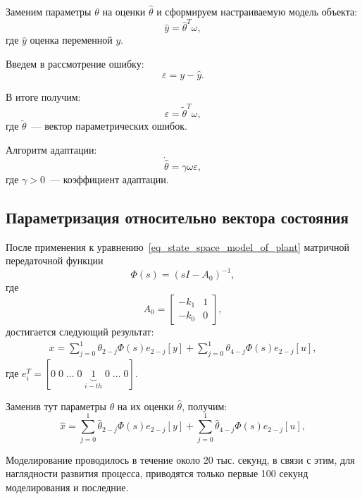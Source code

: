 Заменим	параметры $\theta$ на оценки $\hat{\theta}$ и сформируем настраиваемую модель объекта:
\begin{equation}
\hat{y} = \hat\theta^T \omega,
\end{equation}
где $\hat{y}$ оценка переменной  $y$. 

Введем в рассмотрение ошибку:
\begin{equation}
	\varepsilon = y - \hat{y}.
\end{equation}

В итоге получим:
\begin{equation}
	\varepsilon = \tilde{\theta}^T \omega,
\end{equation}
где $\tilde{\theta}$~--- вектор параметрических ошибок.

Алгоритм адаптации:
\begin{equation}\label{aa}
	\dot{\hat{\theta}} = \gamma \omega \varepsilon,
\end{equation}
где $\gamma > 0$~--- коэффициент адаптации.

\subsection{Параметризация относительно вектора состояния}
После применения к уравнению~\eqref{eq_state_space_model_of_plant} матричной передаточной функции
\begin{equation}
\Phi(s) = (sI - A_0)^{-1},
\end{equation}
где
\begin{equation}
A_0 =
\begin{bmatrix}
-k_1 & 1 \\
-k_0 & 0
\end{bmatrix} \!\!,
\end{equation}
достигается следующий результат:
\begin{gather}
x = \sum_{j=0}^{1} \theta_{2-j} \Phi(s) e_{2-j} [y] + \sum_{j=0}^{1} \theta_{4-j} \Phi(s) e_{2-j} [u],
\end{gather}
где $e_i^T = [0\;0\;\ldots\;0\;\underbrace{1}_{i-th}\;0\;\ldots\;0]$.

Заменив тут параметры $\theta$ на их оценки $\hat{\theta}$, получим:
\begin{equation}
	\hat{x} = \sum_{j=0}^{1} \hat\theta_{2-j} \Phi(s) e_{2-j} [y] + \sum_{j=0}^{1} \hat\theta_{4-j} \Phi(s) e_{2-j} [u],
\end{equation}


Моделирование проводилось в течение около $20$ тыс. секунд, в связи с этим, для наглядности развития процесса, приводятся только первые 100 секунд моделирования и последние.

